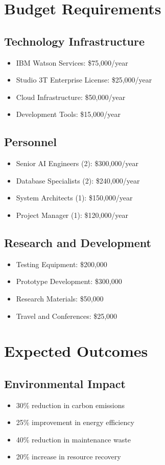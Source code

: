 \documentclass[12pt,a4paper]{article}
\begin{document}
\section{Budget Requirements}
\subsection{Technology Infrastructure}
\begin{itemize}
    \item IBM Watson Services: \$75,000/year
    \item Studio 3T Enterprise License: \$25,000/year
    \item Cloud Infrastructure: \$50,000/year
    \item Development Tools: \$15,000/year
\end{itemize}

\subsection{Personnel}
\begin{itemize}
    \item Senior AI Engineers (2): \$300,000/year
    \item Database Specialists (2): \$240,000/year
    \item System Architects (1): \$150,000/year
    \item Project Manager (1): \$120,000/year
\end{itemize}

\subsection{Research and Development}
\begin{itemize}
    \item Testing Equipment: \$200,000
    \item Prototype Development: \$300,000
    \item Research Materials: \$50,000
    \item Travel and Conferences: \$25,000
\end{itemize}

\section{Expected Outcomes}
\subsection{Environmental Impact}
\begin{itemize}
    \item 30\% reduction in carbon emissions
    \item 25\% improvement in energy efficiency
    \item 40\% reduction in maintenance waste
    \item 20\% increase in resource recovery
\end{itemize}
\end{document}
